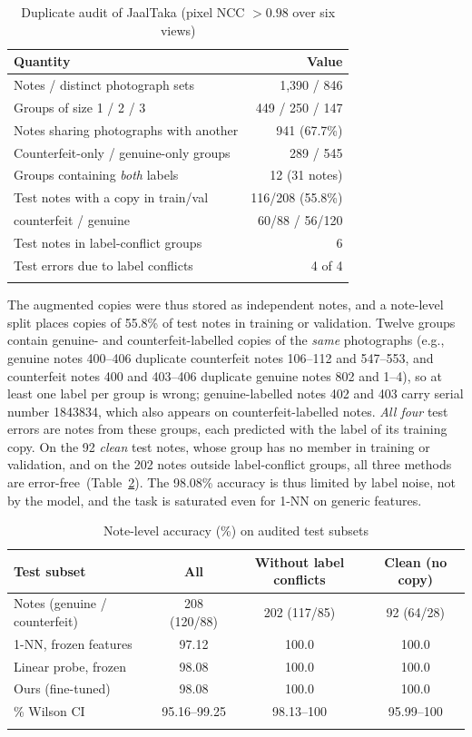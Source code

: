 \documentclass[pdflatex,iicol,sn-mathphys-num]{sn-jnl}
\begin{document}
\begin{table}[!t]
\caption{Duplicate audit of JaalTaka (pixel NCC $>0.98$ over six views)}\label{tab:audit}
\footnotesize
\begin{tabular*}{\columnwidth}{@{\extracolsep\fill}lr}
\toprule
Quantity & Value \\
\midrule
Notes / distinct photograph sets & 1{,}390 / 846 \\
Groups of size 1 / 2 / 3 & 449 / 250 / 147 \\
Notes sharing photographs with another & 941 (67.7\%) \\
Counterfeit-only / genuine-only groups & 289 / 545 \\
Groups containing \emph{both} labels & 12 (31 notes) \\
\midrule
Test notes with a copy in train/val & 116/208 (55.8\%) \\
\quad counterfeit / genuine & 60/88 / 56/120 \\
Test notes in label-conflict groups & 6 \\
Test errors due to label conflicts & 4 of 4 \\
\botrule
\end{tabular*}
\end{table}

The augmented copies were thus stored as independent notes, and a note-level split
places copies of 55.8\% of test notes in training or validation. Twelve groups contain
genuine- and counterfeit-labelled copies of the \emph{same} photographs (e.g., genuine
notes 400--406 duplicate counterfeit notes 106--112 and 547--553, and counterfeit notes
400 and 403--406 duplicate genuine notes 802 and 1--4), so at least one label per group
is wrong; genuine-labelled notes 402 and 403 carry serial number 1843834, which also
appears on counterfeit-labelled notes. \emph{All four} test errors are notes from these
groups, each predicted with the label of its training copy. On the 92 \emph{clean} test
notes, whose group has no member in training or validation, and on the 202 notes outside
label-conflict groups, all three methods are error-free~(Table~\ref{tab:clean}). The
98.08\% accuracy is thus limited by label noise, not by the model, and the task is
saturated even for 1-NN on generic features.

\begin{table}[!t]
\caption{Note-level accuracy (\%) on audited test subsets}\label{tab:clean}
\begin{tabular*}{\textwidth}{@{\extracolsep\fill}lccc}
\toprule
Test subset & All & Without label conflicts & Clean (no copy) \\
\midrule
Notes (genuine / counterfeit) & 208 (120/88) & 202 (117/85) & 92 (64/28) \\
\midrule
1-NN, frozen features & 97.12 & 100.0 & 100.0 \\
Linear probe, frozen & 98.08 & 100.0 & 100.0 \\
Ours (fine-tuned) & 98.08 & 100.0 & 100.0 \\
\quad 95\% Wilson CI & 95.16--99.25 & 98.13--100 & 95.99--100 \\
\botrule
\end{tabular*}
\end{table}
\end{document}

